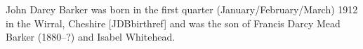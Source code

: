 John Darcy Barker was born in the first quarter (January/February/March) 1912 in the Wirral, Cheshire [JDBbirthref] and was the son of Francis Darcy Mead Barker (1880--?) and Isabel Whitehead.


